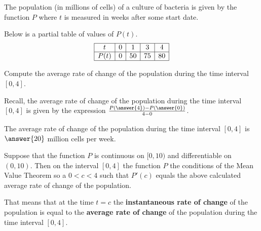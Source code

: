 \documentclass{ximera}
\author{Nela Lakos \and Kyle Parsons}
\begin{document}
The population (in millions of cells) of a culture of bacteria is given by the function $P$ where $t$ is measured in weeks after some start date.

Below is a partial table of values of $P(t)$.
\[
\begin{array}{|c|c|c|c|c|}
\hline
t & 0 & 1 & 3 & 4\\\hline
P(t) & 0 & 50 & 75 & 80\\\hline
\end{array} 
\]
\begin{exercise}
Compute the average rate of change of the population during the time interval $[0,4]$.
\begin{hint}
Recall, the average rate of change of the population during the time interval $[0,4]$ is given by the expression $\frac{P\left(\answer{4}\right)-P\left(\answer{0}\right)}{4-0}$.
\end{hint}
The average rate of change of the population during the time interval $[0,4]$ is $\answer{20}$ million cells per week.
\end{exercise}
\begin{exercise}
Suppose that  the function $P$ is continuous on $[0,10)$ and differentiable on $(0,10)$. Then  on the interval $[0,4]$ the function $P$   the conditions of the Mean Value Theorem so  a $0<c<4$ such that $P'(c)$ equals the above calculated average rate of change of the population.

That means that at the time $t=c$ the \textbf{instantaneous rate of change} of the population is equal to the \textbf{average rate of change} of the population during the time interval $[0,4]$.
\end{exercise}
\end{document}
